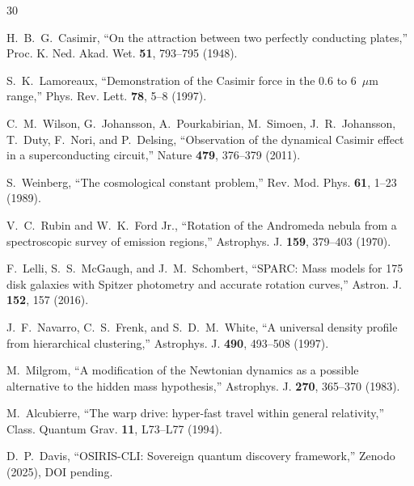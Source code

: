 \documentclass[aps,preprint,superscriptaddress,longbibliography]{revtex4-2}
\begin{document}
\begin{thebibliography}{30}

H.~B.~G.~Casimir,
``On the attraction between two perfectly conducting plates,''
Proc. K. Ned. Akad. Wet. \textbf{51}, 793--795 (1948).

S.~K.~Lamoreaux,
``Demonstration of the Casimir force in the 0.6 to 6~$\mu$m range,''
Phys. Rev. Lett. \textbf{78}, 5--8 (1997).

C.~M.~Wilson, G.~Johansson, A.~Pourkabirian, M.~Simoen,
J.~R.~Johansson, T.~Duty, F.~Nori, and P.~Delsing,
``Observation of the dynamical Casimir effect in a
superconducting circuit,''
Nature \textbf{479}, 376--379 (2011).

S.~Weinberg,
``The cosmological constant problem,''
Rev. Mod. Phys. \textbf{61}, 1--23 (1989).

V.~C.~Rubin and W.~K.~Ford Jr.,
``Rotation of the Andromeda nebula from a spectroscopic survey
of emission regions,''
Astrophys. J. \textbf{159}, 379--403 (1970).

F.~Lelli, S.~S.~McGaugh, and J.~M.~Schombert,
``SPARC: Mass models for 175 disk galaxies with Spitzer
photometry and accurate rotation curves,''
Astron. J. \textbf{152}, 157 (2016).

J.~F.~Navarro, C.~S.~Frenk, and S.~D.~M.~White,
``A universal density profile from hierarchical clustering,''
Astrophys. J. \textbf{490}, 493--508 (1997).

M.~Milgrom,
``A modification of the Newtonian dynamics as a possible
alternative to the hidden mass hypothesis,''
Astrophys. J. \textbf{270}, 365--370 (1983).

M.~Alcubierre,
``The warp drive: hyper-fast travel within general relativity,''
Class. Quantum Grav. \textbf{11}, L73--L77 (1994).

D.~P.~Davis,
``OSIRIS-CLI: Sovereign quantum discovery framework,''
Zenodo (2025), DOI pending.

\end{thebibliography}
\end{document}
